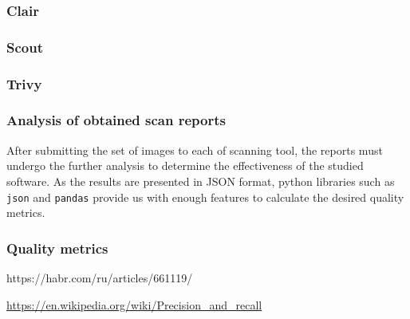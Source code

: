 \subsubsection*{Clair}




\subsubsection*{Scout}





\subsubsection*{Trivy} 




\subsubsection{Analysis of obtained scan reports}

After submitting the set of images to each of scanning tool, the reports must undergo the further analysis to determine the effectiveness of the studied software. As the results are presented in JSON format, python libraries such as \texttt{json} and \texttt{pandas} provide us with enough features to calculate the desired quality metrics. 

\subsubsection*{Quality metrics}

https://habr.com/ru/articles/661119/

\url{https://en.wikipedia.org/wiki/Precision_and_recall}